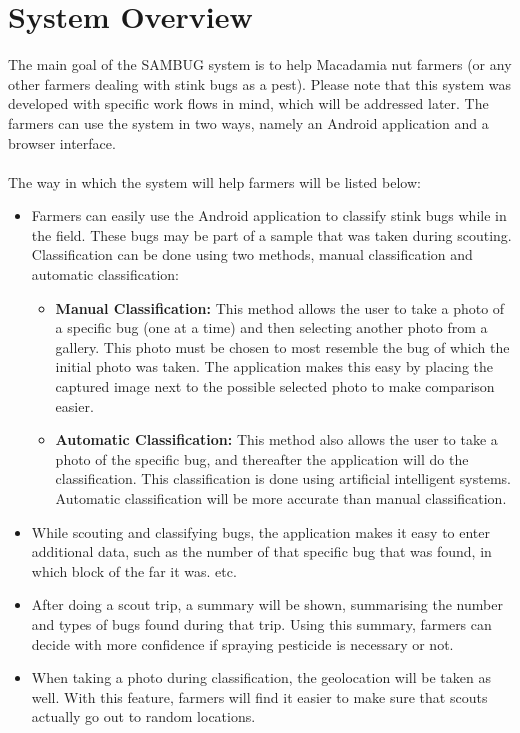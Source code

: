 \documentclass[11pt,a4paper,titlepage]{article}
\begin{document}
\pagebreak

\section{System Overview}
The main goal of the SAMBUG system is to help Macadamia nut farmers (or any other farmers dealing with stink bugs as a pest). Please note that this system was developed with specific work flows in mind, which will be addressed later. 
The farmers can use the system in two ways, namely an Android application and a browser interface.\\\\
The way in which the system will help farmers will be listed below:
	\begin{itemize}
		\item Farmers can easily use the Android application to classify 			stink bugs while in the field. These bugs may be part of a sample 		that was taken during scouting. Classification can be done using 			two methods, manual classification and automatic classification:
		\begin{itemize}
			\item \textbf{Manual Classification:} This method allows the 				user to take a photo of a specific bug (one at a time) and 					then selecting another photo from a gallery. This photo must 				be chosen to most resemble the bug of which the initial photo 			was taken. The application makes this easy by placing the 					captured image next to the possible selected photo to make 					comparison easier.
			\item \textbf{Automatic Classification:} This method also 					allows the user to take a photo of the specific bug, and 					thereafter the application will do the classification. This 				classification is done using artificial intelligent systems. 				Automatic classification will be more accurate than manual 					classification. 
		\end{itemize}
		\item While scouting and classifying bugs, the application makes 
		it easy to enter additional data, such as the number of that 				specific bug that was found, in which block of the far it was. 				etc.
		\item After doing a scout trip, a summary will be shown, 					summarising the number and types of bugs found during that trip. 			Using this summary, farmers can decide with more confidence if 				spraying pesticide is necessary or not.
		\item When taking a photo during classification, the geolocation 			will be taken as well. With this feature, farmers will find it 				easier to make sure that scouts actually go out to random 					locations.

\end{itemize}
\end{document}
